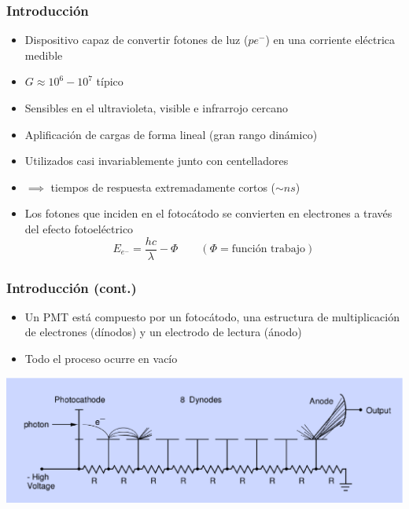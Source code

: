 \documentclass{beamer}
\begin{document}
\begin{frame}
\begin{center}
\Huge{\color{blue}{El tubo fotomultiplicador (PMT)}}
\end{center}
\end{frame}

\begin{frame}
\frametitle{Introducción}
\begin{block}{}
\begin{itemize}
\item Dispositivo capaz de convertir fotones de luz ($pe^-$) en una corriente eléctrica
medible
\item $G \approx 10^6 - 10^7$ típico
\item Sensibles en el {\color{blue}ultravioleta, visible e infrarrojo cercano}
\item Aplificación de cargas de forma \alert{lineal} ({\color{blue}gran rango
dinámico})
\item Utilizados casi invariablemente junto con {\color{blue}centelladores}
\item $\implies$ tiempos de respuesta extremadamente cortos ($\sim ns$)
\item Los fotones que inciden en el fotocátodo se convierten en
electrones a través del \alert{efecto fotoeléctrico}
$$E_{e^-} = \frac{hc}{\lambda} - \Phi \qquad (\Phi = \text{función
trabajo})$$
\end{itemize}
\end{block}
\end{frame} 

\begin{frame}
\frametitle{Introducción (cont.)}
\begin{itemize}
\item Un PMT está compuesto por un \alert{fotocátodo}, una
estructura de multiplicación de electrones (\alert{dínodos}) y un electrodo de
lectura (\alert{ánodo})
\item Todo el proceso ocurre en vacío
\end{itemize}
\includegraphics[height=0.4\textheight,width=\textwidth]{d1/pmt_esquema}
\end{frame} 
\end{document}
